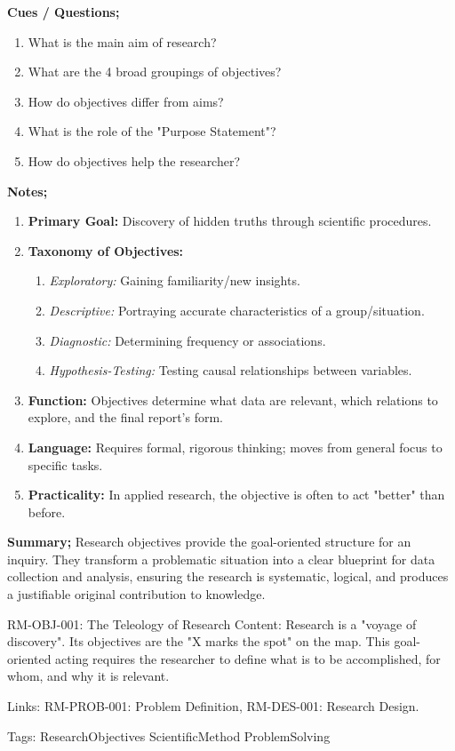 \documentclass{report}
\begin{document}
\begin{cornellnotes}
    \textbf{Cues / Questions;}
    \begin{enumerate}
        \item What is the main aim of research?
        \item What are the 4 broad groupings of objectives?
        \item How do objectives differ from aims?
        \item What is the role of the "Purpose Statement"?
        \item How do objectives help the researcher?
    \end{enumerate}
    \textbf{Notes;}
    \begin{enumerate}
        \item \textbf{Primary Goal:} Discovery of hidden truths through scientific procedures.
        \item \textbf{Taxonomy of Objectives:}
        \begin{enumerate}
            \item \textit{Exploratory:} Gaining familiarity/new insights.
            \item \textit{Descriptive:} Portraying accurate characteristics of a group/situation.
            \item \textit{Diagnostic:} Determining frequency or associations.
            \item \textit{Hypothesis-Testing:} Testing causal relationships between variables.
        \end{enumerate}
        \item \textbf{Function:} Objectives determine what data are relevant, which relations to explore, and the final report's form.
        \item \textbf{Language:} Requires formal, rigorous thinking; moves from general focus to specific tasks.
        \item \textbf{Practicality:} In applied research, the objective is often to act "better" than before.
    \end{enumerate}
    \textbf{Summary;}
    Research objectives provide the goal-oriented structure for an inquiry. They transform a problematic situation into a clear blueprint for data collection and analysis, ensuring the research is systematic, logical, and produces a justifiable original contribution to knowledge.
\end{cornellnotes}

\begin{zettelkasteinnotes}
    RM-OBJ-001: The Teleology of Research Content: Research is a "voyage of discovery". Its objectives are the "X marks the spot" on the map. This goal-oriented acting requires the researcher to define what is to be accomplished, for whom, and why it is relevant. 
    
    Links: RM-PROB-001: Problem Definition, RM-DES-001: Research Design. 
    
    Tags: ResearchObjectives ScientificMethod ProblemSolving
\end{zettelkasteinnotes}
\end{document}
